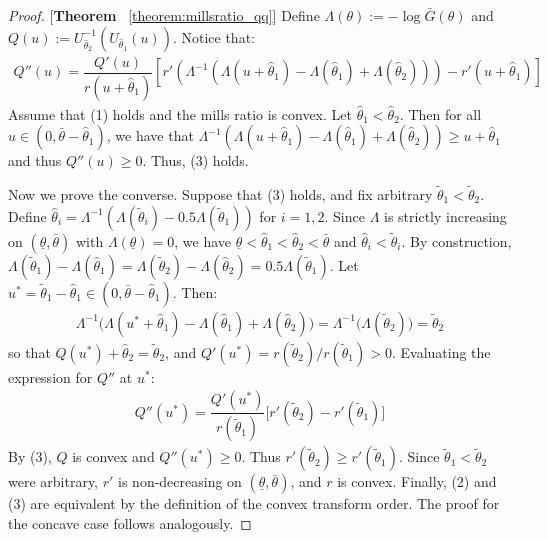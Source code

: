 \begin{proof}{[\textbf{Theorem} ~\ref{theorem:millsratio_qq}]} Define $\Lambda(\theta):=-\log \bar{G}(\theta)$ and $Q(u) := U_{\hat{\theta}_2}^{-1}(U_{\hat{\theta}_1}(u))$. Notice that:
\begin{align*}
    Q''(u) = \dfrac{Q'(u)}{r(u+\hat{\theta}_1)}\left[r'(\Lambda^{-1}(\Lambda(u+\hat{\theta}_1) - \Lambda(\hat{\theta}_1) + \Lambda(\hat{\theta}_2))) - r'(u+\hat{\theta}_1)\right]
\end{align*}
Assume that (1) holds and the mills ratio is convex. Let $\hat{\theta}_1<\hat{\theta}_2$. Then for all $u\in(0,\bar{\theta}-\hat{\theta}_1)$, we have that $\Lambda^{-1}(\Lambda(u+\hat{\theta}_1) - \Lambda(\hat{\theta}_1) + \Lambda(\hat{\theta}_2))\geq u+\hat{\theta}_1$ and thus $Q''(u)\geq 0$. Thus, (3) holds.

\noindent Now we prove the converse. Suppose that (3) holds, and fix arbitrary $\tilde{\theta}_1<\tilde{\theta}_2$. Define $\hat{\theta}_i=\Lambda^{-1}(\Lambda(\tilde{\theta}_i)-0.5\Lambda(\tilde{\theta}_1))$ for $i=1,2$. Since $\Lambda$ is strictly increasing on $(\underline{\theta},\bar{\theta})$ with $\Lambda(\underline{\theta})=0$, we have $\underline{\theta}<\hat{\theta}_1<\hat{\theta}_2<\bar{\theta}$ and $\hat{\theta}_i<\tilde{\theta}_i$. By construction, $\Lambda(\tilde{\theta}_1)-\Lambda(\hat{\theta}_1)=\Lambda(\tilde{\theta}_2)-\Lambda(\hat{\theta}_2)=0.5\Lambda(\tilde{\theta}_1)$. Let $u^*=\tilde{\theta}_1-\hat{\theta}_1\in(0,\bar{\theta}-\hat{\theta}_1)$. Then:
\begin{align*}
    \Lambda^{-1}\big(\Lambda(u^*+\hat{\theta}_1)-\Lambda(\hat{\theta}_1)+\Lambda(\hat{\theta}_2)\big)=\Lambda^{-1}\big(\Lambda(\tilde{\theta}_2)\big)=\tilde{\theta}_2
\end{align*}
so that $Q(u^*)+\hat{\theta}_2=\tilde{\theta}_2$, and $Q'(u^*)=r(\tilde{\theta}_2)/r(\tilde{\theta}_1)>0$. Evaluating the expression for $Q''$ at $u^*$:
\begin{align*}
    Q''(u^*)=\dfrac{Q'(u^*)}{r(\tilde{\theta}_1)}\big[r'(\tilde{\theta}_2)-r'(\tilde{\theta}_1)\big]
\end{align*}
By (3), $Q$ is convex and $Q''(u^*)\geq 0$. Thus $r'(\tilde{\theta}_2)\geq r'(\tilde{\theta}_1)$. Since $\tilde{\theta}_1<\tilde{\theta}_2$ were arbitrary, $r'$ is non-decreasing on $(\underline{\theta},\bar{\theta})$, and $r$ is convex. Finally, (2) and (3) are equivalent by the definition of the convex transform order. The proof for the concave case follows analogously. 
\end{proof}

